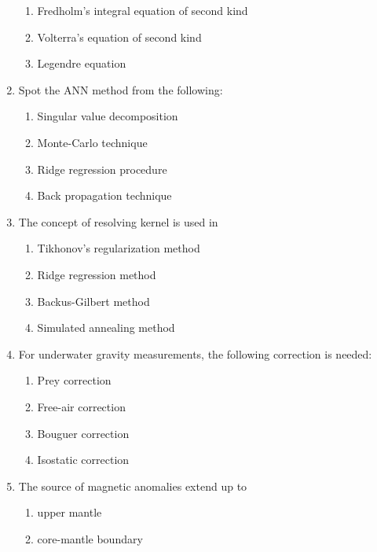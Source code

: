 \documentclass[12pt,fleqn]{article}
\theoremstyle{remark}
\begin{document}
\begin{enumerate}[label=Q.\arabic*.,font=\bfseries, start = 21]
\begin{enumerate}
                \item Fredholm's integral equation of second kind
                \item Volterra's equation of second kind
                \item Legendre equation                
            \end{enumerate}
    \item Spot the ANN method from the following: \hfill{} 
            \begin{enumerate}
                \item Singular value decomposition
                \item Monte-Carlo technique
                \item Ridge regression procedure
                \item Back propagation technique                
            \end{enumerate}
    \item The concept of resolving kernel is used in \hfill{} 
            \begin{enumerate}
                \item Tikhonov's regularization method
                \item Ridge regression method
                \item Backus-Gilbert method
                \item Simulated annealing method                
            \end{enumerate}
    \item For underwater gravity measurements, the following correction is needed: \hfill{} 
            \begin{enumerate}
                \item Prey correction
                \item Free-air correction
                \item Bouguer correction
                \item Isostatic correction                
            \end{enumerate}
    \item The source of magnetic anomalies extend up to \hfill{} 
            \begin{enumerate}
                \item upper mantle
                \item core-mantle boundary

\end{enumerate}
\end{enumerate}
\end{document}
